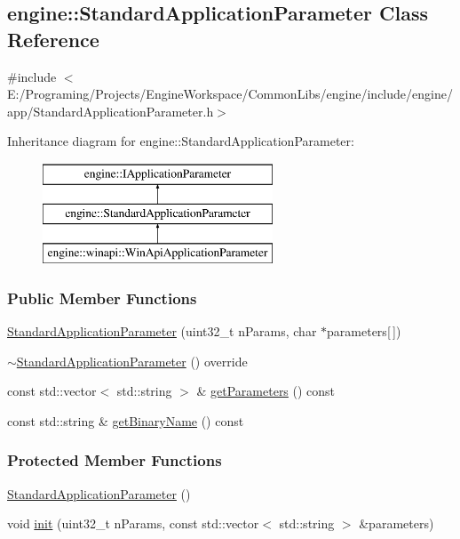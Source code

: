 \hypertarget{a00071}{}\subsection{engine\+:\+:Standard\+Application\+Parameter Class Reference}
\label{a00071}


{\ttfamily \#include $<$E\+:/\+Programing/\+Projects/\+Engine\+Workspace/\+Common\+Libs/engine/include/engine/app/\+Standard\+Application\+Parameter.\+h$>$}

Inheritance diagram for engine\+:\+:Standard\+Application\+Parameter\+:\begin{figure}[H]
\begin{center}
\leavevmode
\includegraphics[height=3.000000cm]{a00071}
\end{center}
\end{figure}
\subsubsection*{Public Member Functions}
\begin{DoxyCompactItemize}
\item 
\hyperlink{a00071_ab0088697771492ee97bdaa9b09a97c08}{Standard\+Application\+Parameter} (uint32\+\_\+t n\+Params, char $\ast$parameters\mbox{[}$\,$\mbox{]})
\item 
\hyperlink{a00071_a91c65b5c5cc6c87005fb618b61daef5a}{$\sim$\+Standard\+Application\+Parameter} () override
\item 
const std\+::vector$<$ std\+::string $>$ \& \hyperlink{a00071_ae482854d2439758cfd1d2c710c621b4f}{get\+Parameters} () const 
\item 
const std\+::string \& \hyperlink{a00071_a5d29ea3dfb725dc1a386926896b5a48a}{get\+Binary\+Name} () const 
\end{DoxyCompactItemize}
\subsubsection*{Protected Member Functions}
\begin{DoxyCompactItemize}
\item 
\hyperlink{a00071_ab09e6ae2065a3a1e1fc4461d5f25c46b}{Standard\+Application\+Parameter} ()
\item 
void \hyperlink{a00071_aaf7d27892d7fbad5573099a4fabb6218}{init} (uint32\+\_\+t n\+Params, const std\+::vector$<$ std\+::string $>$ \&parameters)
\end{DoxyCompactItemize}


